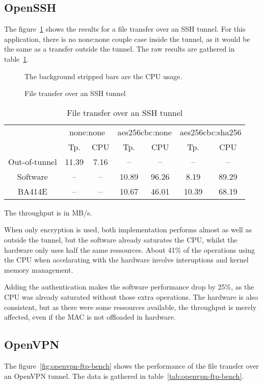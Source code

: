 \subsection{OpenSSH}
The figure~\ref{fig:openssh-bench} shows the results for a file transfer over an SSH tunnel.
For this application, there is no none:none couple case inside the tunnel, as it would be the same as a transfer outside the tunnel.
The raw results are gathered in table~\ref{tab:openssh-bench}.

\begin{figure}[ht]

\caption{File transfer over an SSH tunnel}{The background stripped bars are the CPU usage.}
\label{fig:openssh-bench}
\end{figure}

\begin{table}[ht]
\center
\small
\begin{tabular}{l|c|c|c|c|c|c|} \cline{2-7}
 & \multicolumn{2}{c|}{none:none} & \multicolumn{2}{c|}{aes256cbc:none} & \multicolumn{2}{c|}{aes256cbc:sha256} \\ \cline{2-7}
 & Tp.  & CPU & Tp.  & CPU & Tp.  & CPU \\ \hline
\multicolumn{1}{|c|}{Out-of-tunnel} & 11.39 & 7.16 & -- & -- & -- &  -- \\ \hline
\multicolumn{1}{|c|}{Software} & -- & -- & 10.89 & 96.26 & 8.19 &  89.29 \\ \hline
\multicolumn{1}{|c|}{BA414E} & -- & -- & 10.67 & 46.01 & 10.39 & 68.19 \\ \hline
\end{tabular}
\caption{File transfer over an SSH tunnel}{The throughput is in MB/s.}
\label{tab:openssh-bench}
\end{table}

When only encryption is used, both implementation performs almost as well as outside the tunnel, but the software already saturates the CPU, whilst the hardware only uses half the same ressources.
About 41\% of the operations using the CPU when accelarating with the hardware involve interuptions and kernel memory management.

Adding the authentication makes the software performance drop by 25\%, as the CPU was already saturated without those extra operations.
The hardware is also consistent, but as there were some ressources available, the throughput is merely affected, even if the MAC is not offloaded in hardware.



\subsection{OpenVPN}
The figure~\ref{fig:openvpn-ftp-bench} shows the performance of the file transfer over an OpenVPN tunnel.
The data is gathered in table~\ref{tab:openvpn-ftp-bench}.

